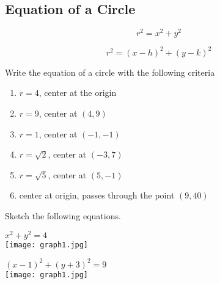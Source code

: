\documentclass[12pt]{article}
\begin{document}
\pagebreak

\subsection*{Equation of a Circle}

$$r^2=x^2+y^2$$

$$r^2=(x-h)^2+(y-k)^2$$

Write the equation of a circle with the following criteria\\

\begin{enumerate}[resume]

	\item $r=4$, center at the origin\\
	
	\item $r=9$, center at $(4,9)$\\
	
	\item $r=1$, center at $(-1,-1)$\\
	
	\item $r=\sqrt{2}$, center at $(-3,7)$\\
	
	\item $r=\sqrt{5}$, center at $(5,-1)$\\
	
	\item center at origin, passes through the point $(9,40)$\\
	
	
\end{enumerate}

\hrulefill

Sketch the following equations.\\

\begin{enumerate}[resume]
\begin{multicols}{2}

	\item $x^2+y^2=4$\\
	
	\texttt{[image: graph1.jpg]}
	
	\item $(x-1)^2+(y+3)^2=9$\\
	
	\texttt{[image: graph1.jpg]}

\end{multicols}
\end{enumerate}
\end{document}
